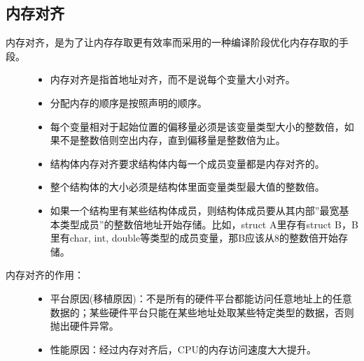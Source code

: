 \documentclass[letterpaper,10pt,english]{sphinxmanual}
\begin{document}
\subsection{内存对齐}
\label{\detokenize{cpp/04_classSize:id11}}\begin{description}
\item[{内存对齐，是为了让内存存取更有效率而采用的一种编译阶段优化内存存取的手段。}] \leavevmode\begin{itemize}
\item {} 
内存对齐是指首地址对齐，而不是说每个变量大小对齐。

\item {} 
分配内存的顺序是按照声明的顺序。

\item {} 
每个变量相对于起始位置的偏移量必须是该变量类型大小的整数倍，如果不是整数倍则空出内存，直到偏移量是整数倍为止。

\item {} 
结构体内存对齐要求结构体内每一个成员变量都是内存对齐的。

\item {} 
整个结构体的大小必须是结构体里面变量类型最大值的整数倍。

\item {} 
如果一个结构里有某些结构体成员，则结构体成员要从其内部”最宽基本类型成员”的整数倍地址开始存储。比如，struct A里存有struct B，B里有char, int, double等类型的成员变量，那B应该从8的整数倍开始存储。

\end{itemize}

\item[{内存对齐的作用：}] \leavevmode\begin{itemize}
\item {} 
平台原因(移植原因)：不是所有的硬件平台都能访问任意地址上的任意数据的；某些硬件平台只能在某些地址处取某些特定类型的数据，否则抛出硬件异常。

\item {} 
性能原因：经过内存对齐后，CPU的内存访问速度大大提升。

\end{itemize}

\end{description}
\end{document}
